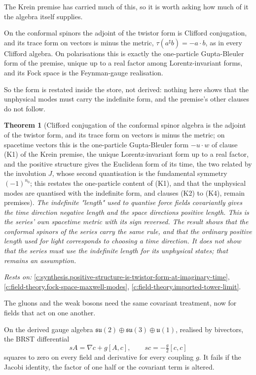 \documentclass[11pt]{article}
\newtheorem{theorem}{Theorem}[section]
\theoremstyle{definition}
\theoremstyle{plain}
\begin{document}
The Krein premise has carried much of this, so it is worth asking how much of it the algebra itself supplies.

On the conformal spinors the adjoint of the twistor form is Clifford conjugation, and its trace form on vectors is minus the metric, $\tau(a^{\sharp}b) = -a\cdot b$, as in every Clifford algebra. On polarisations this is exactly the one-particle Gupta-Bleuler form of the premise, unique up to a real factor among Lorentz-invariant forms, and its Fock space is the Feynman-gauge realisation.

So the form is restated inside the store, not derived: nothing here shows that the unphysical modes must carry the indefinite form, and the premise's other clauses do not follow.

\begin{theorem}[Clifford conjugation of the conformal spinor algebra is the adjoint of the twistor form, and its trace form on vectors is minus the metric; on spacetime vectors this is the one-particle Gupta-Bleuler form $-u\cdot w$ of clause (K1) of the Krein premise, the unique Lorentz-invariant form up to a real factor, and the positive structure gives the Euclidean form of its time, the two related by the involution $J$, whose second quantisation is the fundamental symmetry $(-1)^{n_{0}}$; this restates the one-particle content of (K1), and that the unphysical modes are quantised with the indefinite form, and clauses (K2) to (K4), remain premises]\label{c:synthesis.clifford-conjugation-is-the-twistor-adjoint-and-its-trace-form-is-the-one-particle-gupta-bleuler-form}
The indefinite "length" used to quantise force fields covariantly gives the time direction negative length and the space directions positive length. This is the series' own spacetime metric with its sign reversed. The result shows that the conformal spinors of the series carry the same rule, and that the ordinary positive length used for light corresponds to choosing a time direction. It does not show that the series must use the indefinite length for its unphysical states; that remains an assumption.
\end{theorem}
\noindent\emph{Rests on:} \ref{c:synthesis.positive-structure-is-twistor-form-at-imaginary-time}, \ref{c:field-theory.fock-space-maxwell-modes}, \ref{c:field-theory.imported-tower-limit}.

The gluons and the weak bosons need the same covariant treatment, now for fields that act on one another.

On the derived gauge algebra $\mathfrak{su}(2) \oplus \mathfrak{su}(3) \oplus \mathfrak{u}(1)$, realised by bivectors, the BRST differential \[ sA = \nabla c + g[A, c] , \qquad sc = -\tfrac{g}{2}[c, c] \] squares to zero on every field and derivative for every coupling $g$. It fails if the Jacobi identity, the factor of one half or the covariant term is altered.
\end{document}

